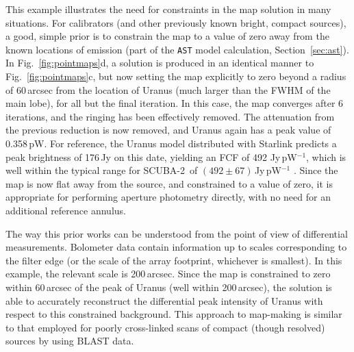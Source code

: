 \documentclass[useAMS,usenatbib,nofootinbib]{mn2e}
\newcommand{\scuba}{SCUBA-2}
\newcommand{\model}[1]{\texttt{#1}}
\begin{document}
This example illustrates the need for constraints in the map solution
in many situations. For calibrators (and other previously known
bright, compact sources), a good, simple prior is to constrain the map
to a value of zero away from the known locations of emission (part of
the \model{AST} model calculation, Section~\ref{sec:ast}).  In
Fig.~\ref{fig:pointmaps}d, a solution is produced in an identical
manner to Fig.~\ref{fig:pointmaps}c, but now setting the map
explicitly to zero beyond a radius of 60\,arcsec from the location of
Uranus (much larger than the FWHM of the main lobe), for all but the
final iteration. In this case, the map converges after 6 iterations,
and the ringing has been effectively removed. The attenuation from the
previous reduction is now removed, and Uranus again has a peak value
of 0.358\,pW. For reference, the Uranus model distributed with
Starlink predicts a peak brightness of 176\,Jy on this date, yielding
an FCF of 492 Jy\,pW$^{-1}$, which is well within the typical range
for \scuba\ of $(492 \pm 67)$\,Jy\,pW$^{-1}$ \citep[see][for
details]{dempsey2012}. Since the map is now flat away from the source,
and constrained to a value of zero, it is appropriate for performing
aperture photometry directly, with no need for an additional reference
annulus.

The way this prior works can be understood from the point of view of
differential measurements. Bolometer data contain information up to
scales corresponding to the filter edge (or the scale of the array
footprint, whichever is smallest). In this example, the relevant scale
is 200\,arcsec. Since the map is constrained to zero within 60\,arcsec
of the peak of Uranus (well within 200\,arcsec), the solution is able
to accurately reconstruct the differential peak intensity of Uranus
with respect to this constrained background. This approach to
map-making is similar to that employed for poorly cross-linked scans
of compact (though resolved) sources by \citet{wiebe2009} using BLAST
data.
\end{document}
